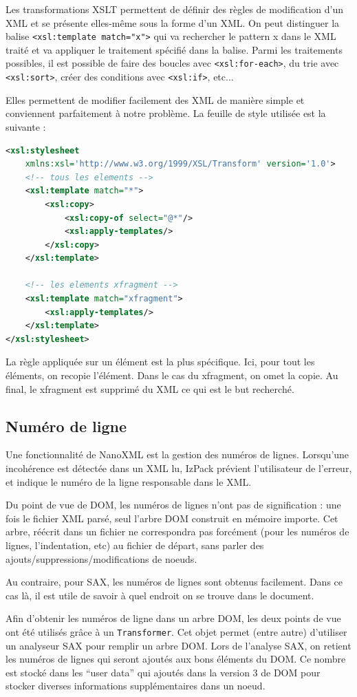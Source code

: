 Les transformations XSLT permettent de définir des règles de modification d'un XML et se présente elles-même sous la forme d'un XML.
On peut distinguer la balise \verb|<xsl:template match="x">| qui va rechercher le pattern x dans le XML traité et va appliquer le traitement spécifié dans la balise.
Parmi les traitements possibles, il est possible de faire des boucles avec \verb|<xsl:for-each>|, du trie avec \verb|<xsl:sort>|, créer des conditions avec \verb|<xsl:if>|, etc...

Elles permettent de modifier facilement des XML de manière simple et conviennent parfaitement à notre problème.
La feuille de style utilisée est la suivante :
\begin{lstlisting}[language=XML]
<xsl:stylesheet 
	xmlns:xsl='http://www.w3.org/1999/XSL/Transform' version='1.0'>
    <!-- tous les elements -->
    <xsl:template match="*">
        <xsl:copy>
            <xsl:copy-of select="@*"/>
            <xsl:apply-templates/>
        </xsl:copy>
    </xsl:template>

    <!-- les elements xfragment -->
    <xsl:template match="xfragment">
        <xsl:apply-templates/>
    </xsl:template>
</xsl:stylesheet>
\end{lstlisting}

La règle appliquée sur un élément est la plus spécifique.
Ici, pour tout les éléments, on recopie l'élément.
Dans le cas du xfragment, on omet la copie.
Au final, le xfragment est supprimé du XML ce qui est le but recherché.
\subsection{Numéro de ligne}
Une fonctionnalité de NanoXML est la gestion des numéros de lignes.
Lorsqu'une incohérence est détectée dans un XML lu, IzPack prévient l'utilisateur de l'erreur, et indique le numéro de la ligne responsable dans le XML.

Du point de vue de DOM, les numéros de lignes n'ont pas de signification : une fois le fichier XML parsé, seul l'arbre DOM construit en mémoire importe.
Cet arbre, réécrit dans un fichier ne correspondra pas forcément (pour les numéros de lignes, l'indentation, etc) au fichier de départ, sans parler des ajouts/suppressions/modifications de noeuds.

Au contraire, pour SAX, les numéros de lignes sont obtenus facilement.
Dans ce cas là, il est utile de savoir à quel endroit on se trouve dans le document.

Afin d'obtenir les numéros de ligne dans un arbre DOM, les deux points de vue ont été utilisés grâce à un \verb|Transformer|.
Cet objet permet (entre autre) d'utiliser un analyseur SAX pour remplir un arbre DOM.
Lors de l'analyse SAX, on retient les numéros de lignes qui seront ajoutés aux bons éléments du DOM.
Ce nombre est stocké dans les ``user data'' qui ajoutés dans la version 3  de DOM pour stocker diverses informations supplémentaires dans un noeud.

